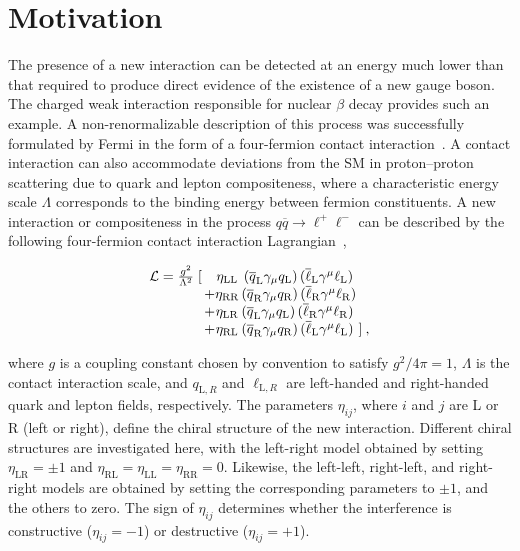 \section{Motivation}\label{sec:ciMotivation}

The presence of a new interaction can be detected at an energy much lower than that required to produce direct evidence of the existence of a new gauge boson. The charged weak interaction responsible for nuclear $\beta$ decay provides such an example. A non-renormalizable description of this process was successfully formulated by Fermi in the form of a four-fermion contact interaction~\cite{Fermi:1934hr}. A contact interaction can also accommodate deviations from the SM in proton--proton scattering due to quark and lepton compositeness, where a characteristic energy scale $\Lambda$ corresponds to the binding energy between fermion constituents. A new interaction or compositeness in the process $q\overline{q} \to \ell^+\ell^-$ can be described by the following four-fermion contact interaction Lagrangian~\cite{eichten, Eichten:1984eu},

\begin{equation}\label{eqn:ciLagrangian}
\begin{array}{r@{\,}c@{}c@{\,}l@{\,}l}
\mathcal L = \frac{g^2}{\Lambda^2}\;[ && \eta_{\mathrm{LL}}&\, (\overline q_{\mathrm L}\gamma_{\mu} q_{\mathrm L})\,(\overline\ell_{\mathrm L}\gamma^{\mu}\ell_{\mathrm L}) \nonumber \\
& +&\eta_{\mathrm{RR}}& (\overline q_{\mathrm R}\gamma_{\mu} q_{\mathrm R}) \,(\overline\ell_{\mathrm R}\gamma^{\mu}\ell_{\mathrm R}) \\
&+&\eta_{\mathrm{LR}}& (\overline q_{\mathrm L}\gamma_{\mu} q_{\mathrm L}) \,(\overline\ell_{\mathrm R}\gamma^{\mu}\ell_{\mathrm R}) \\
&+&\eta_{\mathrm{RL}}& (\overline q_{\mathrm R}\gamma_{\mu} q_{\mathrm R}) \,(\overline\ell_{\mathrm L}\gamma^{\mu}\ell_{\mathrm L})& ] \: ,\nonumber
\end{array}
\end{equation}

\noindent where $g$ is a coupling constant chosen by convention to satisfy $g^2/4\pi = 1$, $\Lambda$ is the contact interaction scale, and $q_{\mathrm L,R}$ and $\ell_{\mathrm L,R}$ are left-handed and right-handed quark and lepton fields, respectively. The parameters $\eta_{ij}$, where $i$ and $j$ are L or R (left or right),  define the chiral structure of the new interaction. Different chiral structures are investigated here, with the left-right model obtained by setting $\eta_{\mathrm{LR}} = \pm 1$ and $\eta_{\mathrm{RL}} = \eta_{\mathrm{LL}} = \eta_{\mathrm{RR}} = 0$. Likewise, the left-left, right-left, and right-right models are obtained by setting the corresponding parameters to $\pm 1$, and the others to zero. The sign of $\eta_{ij}$ determines whether the interference is constructive ($\eta_{ij} = -1$) or destructive ($\eta_{ij} = +1$). 

